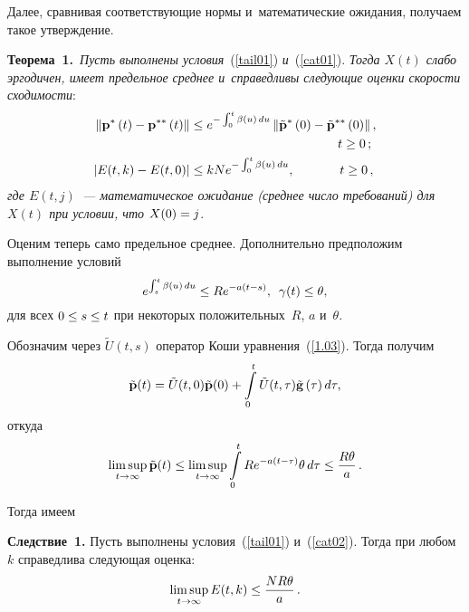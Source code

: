 \begin{multicols}{2}
Далее, сравнивая соответствующие нормы и~математические ожидания, получаем такое утверждение.

\smallskip

\noindent
\textbf{Теорема~1.}\ \textit{Пусть выполнены условия}~(\ref{tail01}) 
\textit{и}~(\ref{cat01}). 
\textit{Тогда $X(t)$ слабо эргодичен, имеет предельное среднее и~справедливы 
следующие оценки ско\-рости схо\-ди\-мости}:
\begin{align*}
\left\|{\mathbf{p}}^{*}\left(t\right)-{\mathbf{p}}^{**}\left(
t\right)\right\|&\le e^{-\int\nolimits_0^t \beta\left(u\right)\, du}
\left\|{\tilde{\mathbf{p}}}^{*}\left(0\right)-{\tilde{\mathbf{p}}}^{**}
\left(0\right)\right\|, \\
 &\hspace*{41mm}t \ge 0\,; 
\\
|E(t,k) - E(t,0)| &\le kN e^{-\int\nolimits_0^t
    \beta\left(u\right)\, du}, \quad\hspace*{9mm}t \ge 0\,, 
\end{align*}
\textit{где $E(t,j)$~--- математическое ожидание (среднее чис\-ло требований) для $X(t)$
 при условии, что $X(0)\hm=j$}.



\smallskip

Оценим теперь само предельное среднее. Дополнительно предположим выполнение условий
\begin{equation} 
e^{\int\nolimits_s^t \beta(u)\, du} \le Re^{-a(t-s)}, \enskip  \gamma(t) \le \theta, 
\label{cat02}
\end{equation}
для всех $0 \le s \hm\le t$ при некоторых положительных~$R$, $a$ и~$\theta$.


Обозначим через $\tilde{U}(t,s)$ оператор Коши уравнения~(\ref{1.03}). Тогда получим
\begin{equation*}
\tilde{\mathbf{p}}(t)=\tilde{U}(t,0)\tilde{\mathbf{p}}(0) + 
\int\limits_0^t \tilde{U}(t,\tau){\tilde{\bf g}}\left(\tau\right) d\tau,
\end{equation*}
откуда
\begin{equation*}
\limsup\limits_{t \to \infty} \tilde{\mathbf{p}}(t) \le  
\limsup\limits_{t \to \infty} \int\limits_0^t Re^{-a(t-\tau)} \theta \, d\tau \le \displaystyle\frac{\displaystyle R\theta\mathstrut}{\displaystyle a\mathstrut}\,.
\end{equation*}


Тогда имеем


\smallskip

\noindent
\textbf{Следствие~1.}
Пусть выполнены условия~(\ref{tail01}) и~(\ref{cat02}). Тогда при любом~$k$ справедлива следующая оценка:
\begin{equation*}
\limsup\limits_{t \to \infty} E(t,k) \le \displaystyle\frac{\displaystyle NR\theta\mathstrut}{\displaystyle a\mathstrut}\,.
\end{equation*}



\end{multicols}

